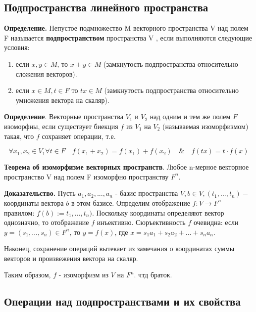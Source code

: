 \documentclass[a4paper]{article}
\begin{document}
\subsection*{Подпространства линейного пространства}
\textbf{Определение.} Непустое подмножество M векторного пространства V над полем F
называется \textbf{подпространством} пространства V , если выполняются
следующие условия:
\begin{enumerate}
\item если $x,y \in M$, то $x+y \in M$ (замкнутость подпространства относительно сложения векторов).
\item если $x \in M, t \in F$ то $tx \in M$ (замкнутость подпространства относительно умножения вектора на скаляр).
\end{enumerate}


\textbf{Определение}. Векторные пространства $V_1$ и $V_2$ над одним и тем же полем $F$ изоморфны, если существует биекция $f$ из $V_1$ на $V_2$ (называемая изоморфизмом) такая, что $f$ сохраняет операции, т.е. 

\begin{equation}
\forall x_1, x_2 \in V_1 \forall t \in F \quad f(x_1+x_2) = f(x_1) + f(x_2) \quad \& \quad f(tx) = t \cdot f(x)
\end{equation}

\begin{htheorem}
\textbf{Теорема об изоморфизме векторных пространств}. Любое n-мерное векторное пространство V над полем F изоморфно
пространству $F^n$.
\end{htheorem}

\begin{hproof}
\textbf{Доказательство.} Пусть $a_1, a_2, ..., a_n$ - базис пространства $V, b \in V, (t_1, ..., t_n) - $ координаты вектора $b$ в этом базисе. Определим отображение $f: V \rightarrow F^n$ правилом: $f(b) := t_1, ..., t_n)$. Поскольку координаты определяют вектор однозначно, то отображение $f$ инъективно. Сюръективность $f$ очевидна: если $y = (s_1, ..., s_n) \in F^n$, то $y = f(x)$, где $x = s_1a_1 + s_2a_2 + ... + s_na_n$.

Наконец, сохранение операций вытекает из замечания о координатах суммы векторов и произвежения вектора на скаляр. 

Таким образом, $f$ - изоморфизм из $V$ на $F^n$. чтд браток.
\end{hproof}

\subsection*{Операции над подпространствами и их свойства}
\end{document}
